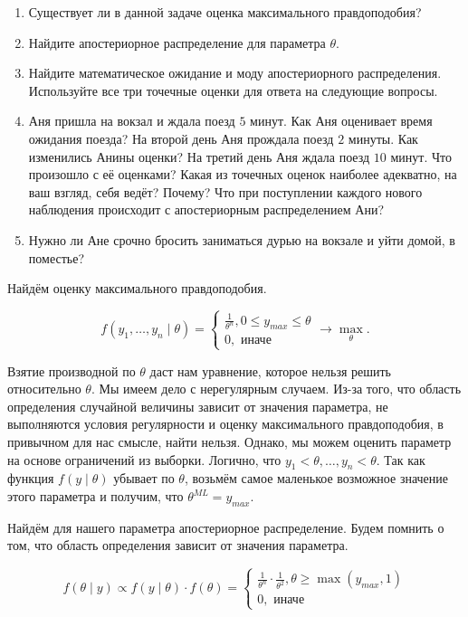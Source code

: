 \begin{problem}
\begin{enumerate}
\item Существует ли в данной задаче оценка максимального правдоподобия?
\item Найдите апостериорное распределение для параметра $\theta$.
\item Найдите математическое ожидание и моду апостериорного распределения. Используйте все три точечные оценки для ответа на следующие вопросы.
\item Аня пришла на вокзал и ждала поезд $5$ минут. Как Аня оценивает время ожидания поезда? На второй  день Аня прождала поезд $2$ минуты. Как изменились Анины оценки?  На третий день Аня ждала поезд $10$ минут. Что произошло с её оценками? Какая из точечных оценок наиболее адекватно, на ваш взгляд, себя ведёт? Почему? Что при поступлении каждого нового наблюдения происходит с апостериорным распределением Ани?  
\item Нужно ли Ане срочно бросить заниматься дурью на вокзале и уйти домой, в поместье?
\end{enumerate} 
\begin{sol}
Найдём оценку максимального правдоподобия. 

\[f(y_1, \ldots, y_n \mid \theta) = \begin{cases}  \frac{1}{\theta^n}, 0 \le y_{max} \le \theta \\ 0, \text{ иначе} \end{cases}  \to \max_{\theta}.\]

Взятие производной по $\theta$ даст нам уравнение, которое нельзя решить относительно $\theta$. Мы имеем дело с нерегулярным случаем. Из-за того, что область определения случайной величины зависит от значения параметра, не выполняются условия регулярности и оценку максимального правдоподобия, в привычном для нас смысле, найти нельзя. Однако, мы можем оценить параметр на основе ограничений из выборки. Логично, что $y_1 < \theta, \ldots, y_n < \theta$. Так как функция $f(y \mid \theta)$ убывает по $\theta$, возьмём самое маленькое возможное значение этого параметра и получим, что $\theta^{ML} = y_{max}$.

Найдём для нашего параметра апостериорное распределение. Будем помнить о том, что область определения зависит от значения параметра.

\[ f(\theta \mid y) \propto f(y \mid \theta) \cdot f(\theta) = \begin{cases} \frac{1}{\theta^n} \cdot \frac{1}{\theta^2}, \theta \ge \max(y_{max},1) \\ 0, \text{ иначе} \end{cases}\]


\end{sol}
\end{problem}
